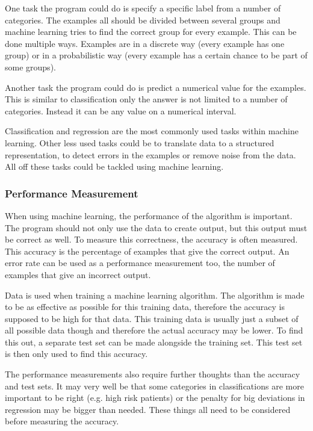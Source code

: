 \documentclass[10pt,a4paper]{report}
\begin{document}
	One task the program could do is specify a specific label from a number of 
	categories. The examples all should be divided between several groups and 
	machine learning tries to find the correct group for every example. This 
	can be done multiple ways. Examples are in a discrete way (every example 
	has one group) or in a probabilistic way (every example has a certain 
	chance to be part of some groups). \cite{Goodfellow-et-al-2016}
	
	Another task the program could do is predict a numerical value for the 
	examples. This is similar to classification only the answer is not limited 
	to a number of categories. Instead it can be any value on a numerical 
	interval.  \cite{Goodfellow-et-al-2016}
	
	Classification and regression are the most commonly used tasks within 
	machine learning. Other less used tasks could be to translate data to a 
	structured representation, to detect errors in the examples or remove noise 
	from the data. All off these tasks could be tackled using machine 
	learning. \cite{Goodfellow-et-al-2016}
	
	\subsubsection{Performance Measurement}
	
	When using machine learning, the performance of the algorithm is important. 
	The program should not only use the data to create output, but this output 
	must be correct as well. To measure this correctness, the accuracy is often 
	measured. This accuracy is the percentage of examples that give the correct 
	output. An error rate can be used as a performance measurement too, the 
	number of examples that give an incorrect 
	output. \cite{Goodfellow-et-al-2016}
	
	Data is used when training a machine learning algorithm. The algorithm is 
	made to be as effective as possible for this training data, therefore the 
	accuracy is supposed to be high for that data. This training data is 
	usually just a subset of all possible data though and therefore the actual 
	accuracy may be lower. To find this out, a separate test set can be made 
	alongside the training set. This test set is then only used to find this 
	accuracy. \cite{Goodfellow-et-al-2016}
	
	The performance measurements also require further thoughts than the 
	accuracy and test sets. It may very well be that some categories in 
	classifications are more important to be right (e.g. high risk patients) or 
	the penalty for big deviations in regression may be bigger than needed. 
	These things all need to be considered before measuring the accuracy. 
	 \cite{Goodfellow-et-al-2016}
	
\end{document}
